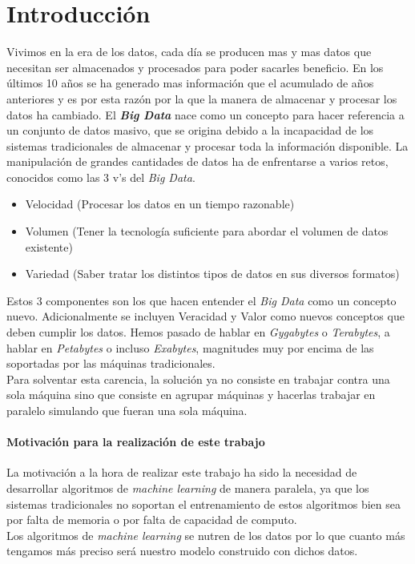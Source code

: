 \chapter*{Introducción}%

Vivimos en la era de los datos, cada día se producen mas y mas datos que
necesitan ser almacenados y procesados para poder sacarles beneficio.
En los últimos 10 años se ha generado mas información que el acumulado de años
anteriores y es por esta razón  por la que la manera de almacenar y procesar
los datos ha cambiado.
El \textbf{\textit{Big Data}}\label{big_data_def} nace como un concepto para hacer referencia a un 
conjunto de datos masivo, que se origina debido a la incapacidad de los sistemas tradicionales 
de almacenar y procesar toda la información disponible.
La manipulación de grandes cantidades de datos ha de enfrentarse a varios
retos, conocidos como las 3 v's del \textit{Big Data}.
\begin{itemize}
  \item Velocidad (Procesar los datos en un tiempo razonable)
  \item Volumen (Tener la tecnología suficiente para abordar el volumen de datos existente)
  \item Variedad (Saber tratar los distintos tipos de datos en sus diversos formatos)
\end{itemize}
Estos 3 componentes son los que hacen entender el \textit{Big Data} como un 
concepto nuevo. Adicionalmente se incluyen Veracidad y Valor como nuevos conceptos que deben cumplir los datos.
Hemos pasado de hablar en \textit{Gygabytes} o \textit{Terabytes}, a hablar 
en \textit{Petabytes} o incluso \textit{Exabytes}, magnitudes muy por encima de las soportadas 
por las máquinas tradicionales.\\
Para solventar esta carencia, la solución ya no consiste en trabajar contra una sola máquina
sino que consiste en agrupar máquinas y hacerlas trabajar en paralelo simulando que fueran una sola máquina.

\subsubsection*{Motivación para la realización de este trabajo}
La motivación a la hora de realizar este trabajo ha sido la necesidad de desarrollar algoritmos 
de \textit{machine learning} de manera paralela, ya que los sistemas tradicionales no soportan 
el entrenamiento de estos algoritmos bien sea por falta de memoria o por falta de capacidad de computo.\\
Los algoritmos de \textit{machine learning} se nutren de los datos por lo que cuanto más tengamos más
preciso será nuestro modelo construido con dichos datos.

